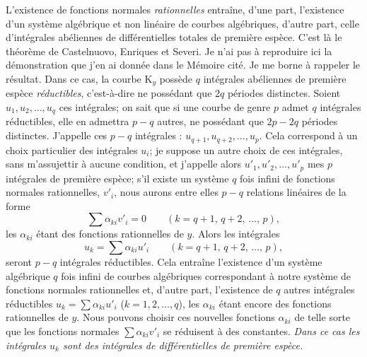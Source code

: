 \documentclass{article}
\begin{document}
L'existence de fonctions normales \emph{rationnelles} entraîne, d'une part, l'existence d'un système algébrique et non linéaire de courbes algébriques, d'autre part, celle d'intégrales abéliennes de différentielles totales de première espèce. C'est là le théorème de Castelnuovo, Enriques et Severi. Je n'ai pas à reproduire ici la démonstration que j'en ai donnée dans le Mémoire cité. Je me borne à rappeler le résultat. Dans ce cas, la courbe $\mathrm{K}_{y}$ possède $q$ intégrales abéliennes de première espèce \emph{réductibles}, c'est-à-dire ne possédant que $2q$ périodes distinctes. Soient $u_{1}, u_{2}, \ldots, u_{q}$ ces intégrales; on sait que si une courbe de genre $p$ admet $q$ intégrales réductibles, elle en admettra $p - q$ autres, ne possédant que $2p - 2q$ périodes distinctes. J'appelle ces $p - q$ intégrales : $u_{q+1}, u_{q+2}, \ldots, u_{p}$. Cela correspond à un choix particulier des intégrales $u_{i}$; je suppose un autre choix de ces intégrales, sans m'assujettir à aucune condition, et j'appelle alors $u'_{1}, u'_{2}, \ldots, u'_{p}$ mes $p$ intégrales de première espèce; s'il existe un système $q$ fois infini de fonctions normales rationnelles, $v'_{i}$, nous aurons entre elles $p - q$ relations linéaires de la forme
\[
\sum \alpha_{ki} v'_{i} = 0 \qquad (k = q + 1,\, q + 2,\, \ldots,\, p),
\]
les $\alpha_{ki}$ étant des fonctions rationnelles de $y$. Alors les intégrales
\[
u_{k} = \sum \alpha_{ki} u'_{i} \qquad (k = q + 1,\, q + 2,\, \ldots,\, p),
\]
seront $p - q$ intégrales réductibles. Cela entraîne l'existence d'un système algébrique $q$ fois infini de courbes algébriques correspondant à notre système de fonctions normales rationnelles et, d'autre part, l'existence de $q$ autres intégrales réductibles $u_{k} = \displaystyle\sum \alpha_{ki} u'_{i}$ ($k = 1, 2, \ldots, q$), les $\alpha_{ki}$ étant encore des fonctions rationnelles de $y$. Nous pouvons choisir ces nouvelles fonctions $\alpha_{ki}$ de telle sorte que les fonctions normales $\displaystyle\sum \alpha_{ki} v'_{i}$ se réduisent à des constantes. \emph{Dans ce cas les intégrales $u_{k}$ sont des intégrales de différentielles de première espèce.}
\end{document}

